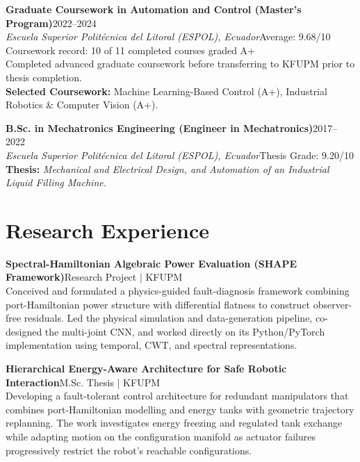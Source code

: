 \documentclass[10pt,a4paper]{article}
\newcommand{\entrytitle}[2]{%
  \textbf{#1}\hfill\textcolor{metacolor}{\small #2}%
}
\newcommand{\entryinst}[2]{%
  \textit{#1}\hfill{\small #2}%
}
\begin{document}
\vspace{8.5pt}
\entrytitle{Graduate Coursework in Automation and Control (Master's Program)}{2022--2024}\\
\entryinst{Escuela Superior Politécnica del Litoral (ESPOL), Ecuador}{Average: 9.68/10}\\
Coursework record: 10 of 11 completed courses graded A+\\
Completed advanced graduate coursework before transferring to KFUPM prior to thesis completion.\\
\textbf{Selected Coursework:} Machine Learning-Based Control (A+), Industrial Robotics \& Computer Vision (A+).

\vspace{8.5pt}
\entrytitle{B.Sc. in Mechatronics Engineering (Engineer in Mechatronics)}{2017--2022}\\
\entryinst{Escuela Superior Politécnica del Litoral (ESPOL), Ecuador}{Thesis Grade: 9.20/10}\\
\textbf{Thesis:} \textit{Mechanical and Electrical Design, and Automation of an Industrial Liquid Filling Machine.}

\vspace{7pt}
\section*{Research Experience}

\entrytitle{Spectral-Hamiltonian Algebraic Power Evaluation (SHAPE Framework)}{Research Project | KFUPM}\\
Conceived and formulated a physics-guided fault-diagnosis framework combining port-Hamiltonian power structure with differential flatness to construct observer-free residuals. Led the physical simulation and data-generation pipeline, co-designed the multi-joint CNN, and worked directly on its Python/PyTorch implementation using temporal, CWT, and spectral representations.

\vspace{4pt}
\entrytitle{Hierarchical Energy-Aware Architecture for Safe Robotic Interaction}{M.Sc. Thesis | KFUPM}\\
Developing a fault-tolerant control architecture for redundant manipulators that combines port-Hamiltonian modelling and energy tanks with geometric trajectory replanning. The work investigates energy freezing and regulated tank exchange while adapting motion on the configuration manifold as actuator failures progressively restrict the robot's reachable configurations.
\end{document}
